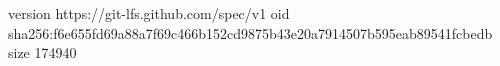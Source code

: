 version https://git-lfs.github.com/spec/v1
oid sha256:f6e655fd69a88a7f69c466b152cd9875b43e20a7914507b595eab89541fcbedb
size 174940
